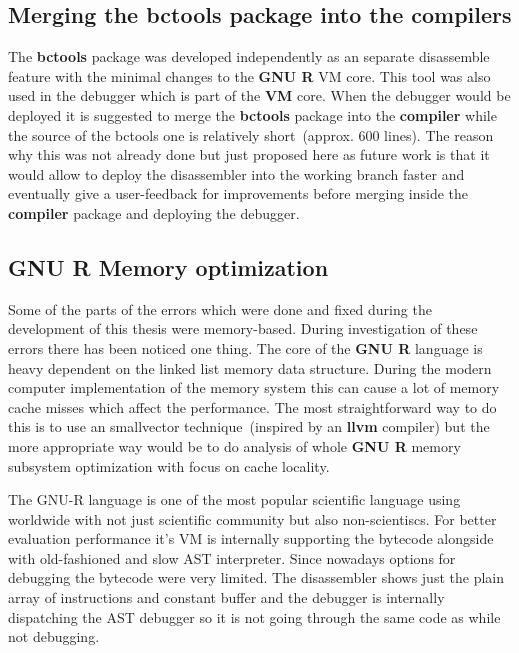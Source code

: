 \documentclass[thesis=M,english]{FITthesis}[2018/10/20]
\begin{document}
{\subsection{Merging the bctools package into the compilers}

The \textbf{bctools} package was developed independently as an separate disassemble feature with the minimal changes to the \textbf{GNU R} VM core. This tool was also used in the debugger which is part of the \textbf{VM} core. When the debugger would be deployed it is suggested to merge the \textbf{bctools} package into the \textbf{compiler} while the source of the bctools one is relatively short~(approx. 600 lines). The reason why this was not already done but just proposed here as future work is that it would allow to deploy the disassembler into the working branch faster and eventually give a user-feedback for improvements before merging inside the \textbf{compiler} package and deploying the debugger.

\subsection{GNU R Memory optimization}

Some of the parts of the errors which were done and fixed during the development of this thesis were memory-based. During investigation of these errors there has been noticed one thing. The core of the \textbf{GNU R} language is heavy dependent on the linked list memory data structure. During the modern computer implementation of the memory system this can cause a lot of memory cache misses which affect the performance. The most straightforward way to do this is to use an smallvector technique~(inspired by an \textbf{llvm} compiler) but the more appropriate way would be to do analysis of whole \textbf{GNU R} memory subsystem optimization with focus on cache locality.

\begin{conclusion}

The GNU-R language is one of the most popular scientific language using worldwide with not just scientific community but also non-scientiscs. For better evaluation performance it's VM is internally supporting the bytecode alongside with old-fashioned and slow AST interpreter. Since nowadays options for debugging the bytecode were very limited. The disassembler shows just the plain array of instructions and constant buffer and the debugger is internally dispatching the AST debugger so it is not going through the same code as while not debugging. 


\end{conclusion}}
\end{document}
